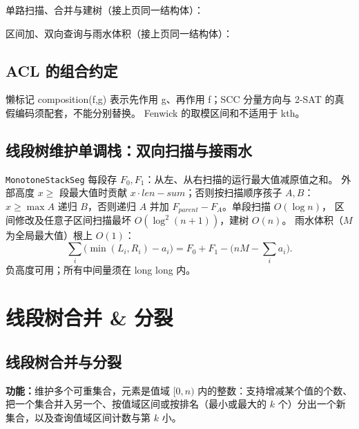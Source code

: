 \Needspace{492pt}



\newpage

\noindent 单路扫描、合并与建树（接上页同一结构体）：



\newpage

\noindent 区间加、双向查询与雨水体积（接上页同一结构体）：



\subsection{ACL 的组合约定}\label{knowledge-acl-compose}
懒标记 composition(f,g) 表示先作用 g、再作用 f；SCC 分量方向与 2-SAT 的真假编码须配套，不能分别替换。
Fenwick 的取模区间和不适用于 kth。



\subsection{线段树维护单调栈：双向扫描与接雨水}\label{knowledge-seg-stack}
\texttt{MonotoneStackSeg} 每段存 $F_0,F_1$：从左、从右扫描的运行最大值减原值之和。
外部高度 $x\ge$ 段最大值时贡献 $x\cdot len-sum$；否则按扫描顺序孩子 $A,B$：
$x\ge\max A$ 递归 $B$，否则递归 $A$ 并加 $F_{parent}-F_A$。单段扫描 $O(\log n)$，
区间修改及任意子区间扫描最坏 $O(\log^2(n+1))$，建树 $O(n)$。
雨水体积（$M$ 为全局最大值）根上 $O(1)$：
\[
\sum_i\bigl(\min(L_i,R_i)-a_i\bigr)
=F_0+F_1-\bigl(nM-\sum_i a_i\bigr).
\]
负高度可用；所有中间量须在 long long 内。



\Needspace{180pt}

\section{线段树合并 \& 分裂}

\subsection{线段树合并与分裂}\label{compact-MergeSplitTree}

\noindent\textbf{功能：}\allowbreak 维护多个可重集合，元素是值域 $[0,n)$ 内的整数：支持增减某个值的个数、把一个集合并入另一个、按值域区间或按排名（最小或最大的 $k$ 个）分出一个新集合，以及查询值域区间计数与第 $k$ 小。

